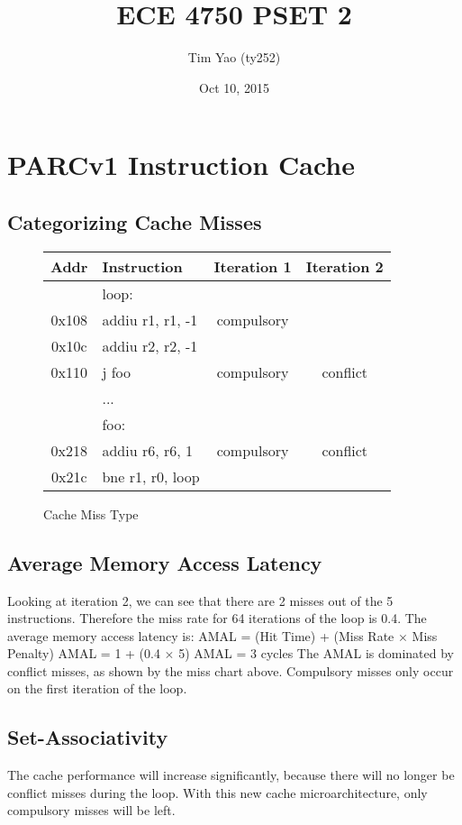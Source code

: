 \documentclass[10pt]{article}
\title{ECE 4750 PSET 2}
\author{Tim Yao (ty252)}
\date{Oct 10, 2015}
\begin{document}
\maketitle
\newcommand*{\tableindent}{\hspace*{0.3cm}}%

\section{PARCv1 Instruction Cache} 
\subsection{Categorizing Cache Misses}
\begin{figure}[H]
\centering
\begin{tabular}{clcc}
\hline
\textbf{Addr} &\textbf{Instruction}& \textbf{Iteration 1} & \textbf{Iteration 2}\\
\hline
& loop: & & \\
0x108 & \tableindent addiu r1, r1, -1 & compulsory & \\
0x10c & \tableindent addiu r2, r2, -1 & 		   & \\
0x110 & \tableindent j foo			  & compulsory & conflict \\
	  & ...							  & 		   & \\
	  & foo:						  & 		   & \\
0x218 & \tableindent addiu r6, r6, 1  & compulsory & conflict \\
0x21c & \tableindent bne r1, r0, loop & 	       & \\
\hline
\end{tabular}
\caption{Cache Miss Type}
\end{figure}

\subsection{Average Memory Access Latency}
Looking at iteration 2, we can see that there are 2 misses out of the 5 instructions. Therefore the miss rate for 64 iterations of the loop is 0.4.
The average memory access latency is:
AMAL = (Hit Time) + (Miss Rate $\times$ Miss Penalty)
AMAL = 1 + (0.4 $\times$ 5)
AMAL = 3 cycles
The AMAL is dominated by conflict misses, as shown by the miss chart above. Compulsory misses only occur on the first iteration of the loop.

\subsection{Set-Associativity}
The cache performance will increase significantly, because there will no longer be conflict misses during the loop. With this new cache microarchitecture, only compulsory misses will be left. 
\end{document}
